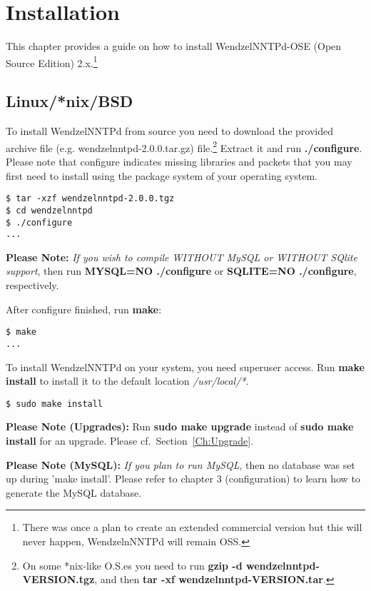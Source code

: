 \chapter{Installation}

This chapter provides a guide on how to install WendzelNNTPd-OSE (Open Source Edition) 2.x.\footnote{There was once a plan to create an extended commercial version but this will never happen, WendzelnNNTPd will remain OSS.}

\section{Linux/*nix/BSD}

To install WendzelNNTPd from source you need to download the provided archive file (e.g. wendzelnntpd-2.0.0.tar.gz) file.\footnote{On some *nix-like O.S.es you need to run {\bf gzip -d wendzelnntpd-VERSION.tgz}, and then {\bf tar -xf wendzelnntpd-VERSION.tar}.} Extract it and run {\bf ./configure}. Please note that configure indicates missing libraries and packets that you may first need to install using the package system of your operating system.

\begin{verbatim}
$ tar -xzf wendzelnntpd-2.0.0.tgz
$ cd wendzelnntpd
$ ./configure
...
\end{verbatim}

{\bf Please Note:} {\it If you wish to compile WITHOUT MySQL or WITHOUT SQlite support}, then run {\bf MYSQL=NO ./configure} or {\bf SQLITE=NO ./configure}, respectively.

After configure finished, run {\bf make}:

\begin{verbatim}
$ make
...
\end{verbatim}

To install WendzelNNTPd on your system, you need superuser access. Run {\bf make install} to install it to the default location {\it /usr/local/*}.

\begin{verbatim}
$ sudo make install
\end{verbatim}

{\bf Please Note (Upgrades):} Run {\bf sudo make upgrade} instead of {\bf sudo make install} for an upgrade. Please cf.\ Section~\ref{Ch:Upgrade}.

{\bf Please Note (MySQL):} {\it If you plan to run MySQL}, then no database was set up during 'make install'. Please refer to chapter 3 (configuration) to learn how to generate the MySQL database.

